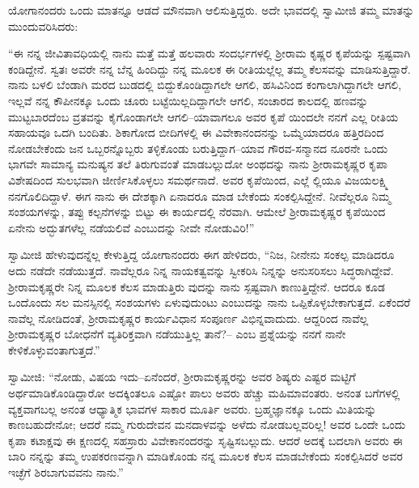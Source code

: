 ಯೋಗಾನಂದರು ಒಂದು ಮಾತನ್ನೂ ಆಡದೆ ಮೌನವಾಗಿ ಆಲಿಸುತ್ತಿದ್ದರು. ಅದೇ ಭಾವದಲ್ಲಿ ಸ್ವಾಮೀಜಿ ತಮ್ಮ ಮಾತನ್ನು ಮುಂದುವರಿಸಿದರು:

“ಈ ನನ್ನ ಜೀವಿತಾವಧಿಯಲ್ಲಿ ನಾನು ಮತ್ತೆ ಮತ್ತೆ ಹಲವಾರು ಸಂದರ್ಭಗಳಲ್ಲಿ ಶ್ರೀರಾಮ ಕೃಷ್ಣರ ಕೃಪೆಯನ್ನು ಸ್ಪಷ್ಟವಾಗಿ ಕಂಡಿದ್ದೇನೆ. ಸ್ವತಃ ಅವರೇ ನನ್ನ ಬೆನ್ನ ಹಿಂದಿದ್ದು ನನ್ನ ಮೂಲಕ ಈ ರೀತಿಯಲ್ಲೆಲ್ಲ ತಮ್ಮ ಕೆಲಸವನ್ನು ಮಾಡಿಸುತ್ತಿದ್ದಾರೆ. ನಾನು ಬಳಲಿ ಬೆಂಡಾಗಿ ಮರದ ಬುಡದಲ್ಲಿ ಬಿದ್ದುಕೊಂಡಿದ್ದಾಗಲೇ ಆಗಲಿ, ಹಸಿವಿನಿಂದ ಕಂಗಾಲಾಗಿದ್ದಾಗಲೇ ಆಗಲಿ, ಇಲ್ಲವೆ ನನ್ನ ಕೌಪೀನಕ್ಕೂ ಒಂದು ಚೂರು ಬಟ್ಟೆಯಿಲ್ಲದಿದ್ದಾಗಲೇ ಆಗಲಿ, ಸಂಚಾರದ ಕಾಲದಲ್ಲಿ ಹಣವನ್ನು ಮುಟ್ಟಬಾರದೆಂಬ ವ್ರತವನ್ನು ಕೈಗೊಂಡಾಗಲೇ ಆಗಲಿ–ಯಾವಾಗಲೂ ಅವರ ಕೃಪೆ ಯಿಂದಲೇ ನನಗೆ ಎಲ್ಲ ರೀತಿಯ ಸಹಾಯವೂ ಒದಗಿ ಬಂದಿತು. ಶಿಕಾಗೋದ ಬೀದಿಗಳಲ್ಲಿ ಈ ವಿವೇಕಾನಂದನನ್ನು ಒಮ್ಮೆಯಾದರೂ ಹತ್ತಿರದಿಂದ ನೋಡಬೇಕೆಂದು ಜನ ಒಬ್ಬರನ್ನೊಬ್ಬರು ತಳ್ಳಿಕೊಂಡು ಬರುತ್ತಿದ್ದಾಗ–ಯಾವ ಗೌರವ-ಸನ್ಮಾನದ ನೂರನೇ ಒಂದು ಭಾಗವೇ ಸಾಮಾನ್ಯ ಮನುಷ್ಯನ ತಲೆ ತಿರುಗುವಂತೆ ಮಾಡಬಲ್ಲುದೋ ಅಂಥದನ್ನು ನಾನು ಶ್ರೀರಾಮಕೃಷ್ಣರ ಕೃಪಾ ವಿಶೇಷದಿಂದ ಸುಲಭವಾಗಿ ಜೀರ್ಣಿಸಿಕೊಳ್ಳಲು ಸಮರ್ಥನಾದೆ. ಅವರ ಕೃಪೆಯಿಂದ, ಎಲ್ಲೆ ಲ್ಲಿಯೂ ವಿಜಯಲಕ್ಷ್ಮಿ ನನಗೊಲಿದಿದ್ದಾಳೆ. ಈಗ ನಾನು ಈ ದೇಶಕ್ಕಾಗಿ ಏನಾದರೂ ಮಾಡ ಬೇಕೆಂದು ಸಂಕಲ್ಪಿಸಿದ್ದೇನೆ. ನೀವೆಲ್ಲರೂ ನಿಮ್ಮ ಸಂಶಯಗಳನ್ನು, ತಪ್ಪು ಕಲ್ಪನೆಗಳನ್ನು ಬಿಟ್ಟು ಈ ಕಾರ್ಯದಲ್ಲಿ ನೆರವಾಗಿ. ಆಮೇಲೆ ಶ್ರೀರಾಮಕೃಷ್ಣರ ಕೃಪೆಯಿಂದ ಏನೇನು ಅದ್ಭುತಗಳೆಲ್ಲ ನಡೆಯಲಿವೆ ಎಂಬುದನ್ನು ನೀವೇ ನೋಡುವಿರಿ!”

ಸ್ವಾಮೀಜಿ ಹೇಳುವುದನ್ನೆಲ್ಲ ಕೇಳುತ್ತಿದ್ದ ಯೋಗಾನಂದರು ಈಗ ಹೇಳಿದರು, “ನಿಜ, ನೀನೇನು ಸಂಕಲ್ಪ ಮಾಡಿದರೂ ಅದು ನಡೆದೇ ನಡೆಯುತ್ತದೆ. ನಾವೆಲ್ಲರೂ ನಿನ್ನ ನಾಯಕತ್ವವನ್ನು ಸ್ವೀಕರಿಸಿ ನಿನ್ನನ್ನು ಅನುಸರಿಸಲು ಸಿದ್ಧರಾಗಿದ್ದೇವೆ. ಶ್ರೀರಾಮಕೃಷ್ಣರೇ ನಿನ್ನ ಮೂಲಕ ಕೆಲಸ ಮಾಡುತ್ತಿರು ವುದನ್ನು ನಾನು ಸ್ಪಷ್ಟವಾಗಿ ಕಾಣುತ್ತಿದ್ದೇನೆ. ಆದರೂ ಕೂಡ ಒಂದೊಂದು ಸಲ ಮನಸ್ಸಿನಲ್ಲಿ ಸಂಶಯಗಳು ಏಳುವುದುಂಟು ಎಂಬುದನ್ನು ನಾನು ಒಪ್ಪಿಕೊಳ್ಳಬೇಕಾಗುತ್ತದೆ. ಏಕೆಂದರೆ ನಾವೆಲ್ಲ ನೋಡಿದಂತೆ, ಶ್ರೀರಾಮಕೃಷ್ಣರ ಕಾರ್ಯವಿಧಾನ ಸಂಪೂರ್ಣ ವಿಭಿನ್ನವಾದುದು. ಆದ್ದರಿಂದ ನಾವೆಲ್ಲ ಶ್ರೀರಾಮಕೃಷ್ಣರ ಬೋಧನೆಗೆ ವ್ಯತಿರಿಕ್ತವಾಗಿ ನಡೆಯುತ್ತಿಲ್ಲ ತಾನೆ?– ಎಂಬ ಪ್ರಶ್ನೆಯನ್ನು ನನಗೆ ನಾನೇ ಕೇಳಿಕೊಳ್ಳುವಂತಾಗುತ್ತದೆ.”

ಸ್ವಾಮೀಜಿ: “ನೋಡು, ವಿಷಯ ಇದು–ಏನೆಂದರೆ, ಶ್ರೀರಾಮಕೃಷ್ಣರನ್ನು ಅವರ ಶಿಷ್ಯರು ಎಷ್ಟರ ಮಟ್ಟಿಗೆ ಅರ್ಥಮಾಡಿಕೊಂಡಿದ್ದಾರೋ ಅದಕ್ಕಿಂತಲೂ ಎಷ್ಟೋ ಪಾಲು ಅವರು ಹೆಚ್ಚು ಮಹಿಮಾವಂತರು. ಅನಂತ ಬಗೆಗಳಲ್ಲಿ ವ್ಯಕ್ತವಾಗಬಲ್ಲ ಅನಂತ ಆಧ್ಯಾತ್ಮಿಕ ಭಾವಗಳ ಸಾಕಾರ ಮೂರ್ತಿ ಅವರು. ಬ್ರಹ್ಮಜ್ಞಾನಕ್ಕೂ ಒಂದು ಮಿತಿಯನ್ನು ಕಾಣಬಹುದೇನೋ; ಆದರೆ ನಮ್ಮ ಗುರುದೇವನ ಮನದಾಳವನ್ನು ಅಳೆದು ನೋಡಬಲ್ಲವರಿಲ್ಲ! ಅವರ ಒಂದೇ ಒಂದು ಕೃಪಾ ಕಟಾಕ್ಷವು ಈ ಕ್ಷಣದಲ್ಲಿ ಸಹಸ್ರಾರು ವಿವೇಕಾನಂದರನ್ನು ಸೃಷ್ಟಿಸಬಲ್ಲುದು. ಆದರೆ ಅದಕ್ಕೆ ಬದಲಾಗಿ ಅವರು ಈ ಬಾರಿ ನನ್ನನ್ನು ತಮ್ಮ ಉಪಕರಣವನ್ನಾಗಿ ಮಾಡಿಕೊಂಡು ನನ್ನ ಮೂಲಕ ಕೆಲಸ ಮಾಡಬೇಕೆಂದು ಸಂಕಲ್ಪಿಸಿದರೆ ಅವರ ಇಚ್ಛೆಗೆ ಶಿರಬಾಗುವವನು ನಾನು.”


